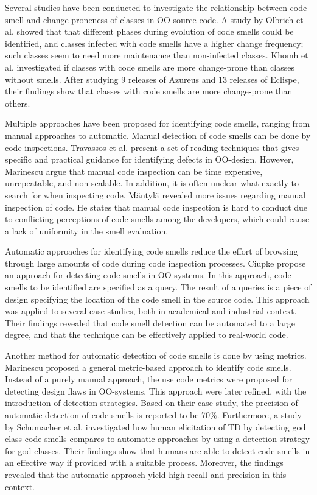 Several studies have been conducted to investigate the relationship between code smell and change-proneness of classes in OO source code. A study by Olbrich et al.\cite{olbrich2009evolution} showed that that different phases during evolution of code smells could be identified, and classes infected with code smells have a higher change frequency; such classes seem to need more maintenance than non-infected classes. Khomh et al.\cite{khomh2009exploratory} investigated if classes with code smells are more change-prone than classes without smells. After studying 9 releases of Azureus and 13 releases of Eclispe, their findings show that classes with code smells are more change-prone than others.

Multiple approaches have been proposed for identifying code smells, ranging from manual approaches to automatic. Manual detection of code smells can be done by code inspections\cite{travassos1999detecting}. Travassos et al.\cite{travassos1999detecting} present a set of reading techniques that gives specific and practical guidance for identifying defects in OO-design. However, Marinescu\cite{marinescu2001detecting} argue that manual code inspection can be time expensive, unrepeatable, and non-scalable. In addition, it is often unclear what exactly to search for when inspecting code\cite{ciupke1999automatic}. Mäntylä\cite{mantyla2003taxonomy} revealed more issues regarding manual inspection of code. He states that manual code inspection is hard to conduct due to conflicting perceptions of code smells among the developers, which could cause a lack of uniformity in the smell evaluation. 

Automatic approaches for identifying code smells reduce the effort of browsing through large amounts of code during code inspection processes. Ciupke\cite{ciupke1999automatic} propose an approach for detecting code smells in OO-systems. In this approach, code smells to be identified are specified as a query. The result of a queries is a piece of design specifying the location of the code smell in the source code. This approach was applied to several case studies, both in academical and industrial context. Their findings revealed that code smell detection can be automated to a large degree, and that the technique can be effectively applied to real-world code.

Another method for automatic detection of code smells is done by using metrics. Marinescu\cite{marinescu2001detecting} proposed a general metric-based approach to identify code smells. Instead of a purely manual approach, the use code metrics were proposed for detecting design flaws in OO-systems. This approach were later refined, with the introduction of detection strategies\cite{marinescu2004detection}. Based on their case study, the precision of automatic detection of code smells is reported to be 70\%. Furthermore, a study by Schumacher et al.\cite{schumacher2010building} investigated how human elicitation of TD by detecting god class code smells compares to automatic approaches by using a detection strategy for god classes. Their findings show that humans are able to detect code smells in an effective way if provided with a suitable process. Moreover, the findings revealed that the automatic approach yield high recall and precision in this context. 

